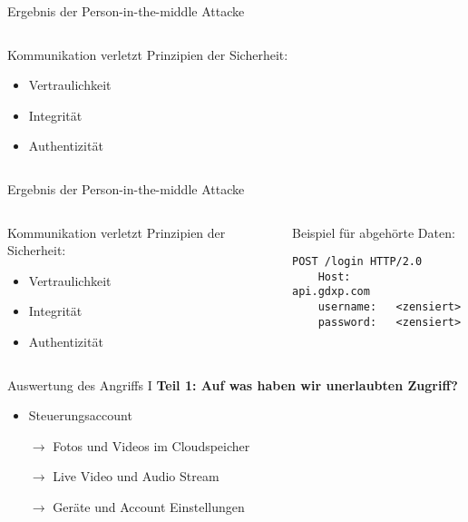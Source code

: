 \documentclass[11pt, aspectratio=169, modernfonts]{beamer}
\begin{document}
    \begin{frame}[fragile]{Ergebnis der Person-in-the-middle Attacke}
        \begin{columns}
            \begin{column}{0.5\textwidth}
                Kommunikation verletzt Prinzipien der Sicherheit:
                \begin{itemize}
                    \item Vertraulichkeit
                    \item Integrität
                    \item Authentizität
                \end{itemize}
            \end{column}
            \begin{column}{0.5\textwidth}
            \end{column}
        \end{columns}
    \end{frame}

    \begin{frame}[fragile]{Ergebnis der Person-in-the-middle Attacke}
        \begin{columns}
            \begin{column}{0.5\textwidth}
                Kommunikation verletzt Prinzipien der Sicherheit:
                \begin{itemize}
                    \item Vertraulichkeit
                    \item Integrität
                    \item Authentizität
                \end{itemize}
            \end{column}
            \break
            \begin{column}{0.5\textwidth}
                Beispiel für abgehörte Daten:
                \begin{lstlisting}[basicstyle=\ttfamily, label={lst:sign-in}]
POST /login HTTP/2.0
    Host:       api.gdxp.com
    username:   <zensiert>
    password:   <zensiert>
                \end{lstlisting}
            \end{column}

        \end{columns}
    \end{frame}

    \begin{frame}{Auswertung des Angriffs I}
        \textbf{Teil 1: Auf was haben wir unerlaubten Zugriff?}\\[0.2cm]
        \begin{itemize}
            \item Steuerungsaccount
            \item[$\rightarrow$] Fotos und Videos im Cloudspeicher
            \item[$\rightarrow$] Live Video und Audio Stream
            \item[$\rightarrow$] Geräte und Account Einstellungen
        \end{itemize}
    \end{frame}
\end{document}
